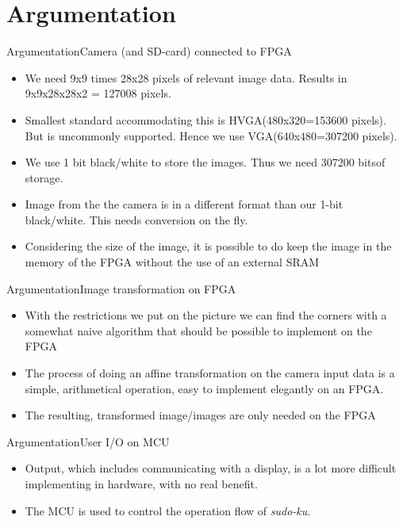 \documentclass[10pt]{beamer}
\begin{document}
\section{Argumentation}
\begin{frame}{Argumentation}{Camera (and SD-card) connected to FPGA}
\begin{itemize}
\item We need 9x9 times 28x28 pixels of relevant image data. Results in 9x9x28x28x2 = 127008 pixels.
\item Smallest standard accommodating this is HVGA(480x320=153600 pixels). But is uncommonly supported. Hence we use VGA(640x480=307200 pixels).
\item We use 1 bit black/white to store the images. Thus we need 307200 bitsof storage.
\item Image from the the camera is in a different format than our 1-bit black/white. This needs conversion on the fly.
\item Considering the size of the image, it is possible to do keep the image in the memory of the FPGA without the use of an external SRAM
\end{itemize}
\end{frame}

\begin{frame}{Argumentation}{Image transformation on FPGA}
\begin{itemize}
\item With the restrictions we put on the picture we can find the corners with a somewhat naive algorithm that should be possible to implement on the FPGA
\item The process of doing an affine transformation on the camera input data is a simple, arithmetical operation, easy to implement elegantly on an FPGA.
\item The resulting, transformed image/images are only needed on the FPGA
\end{itemize}
\end{frame}

\begin{frame}{Argumentation}{User I/O on MCU}
\begin{itemize}
\item Output, which includes communicating with a display, is a lot more difficult implementing in hardware, with no real benefit.
\item The MCU is used to control the operation flow of \textit{sudo-ku}.
\end{itemize}
\end{frame}
\end{document}
